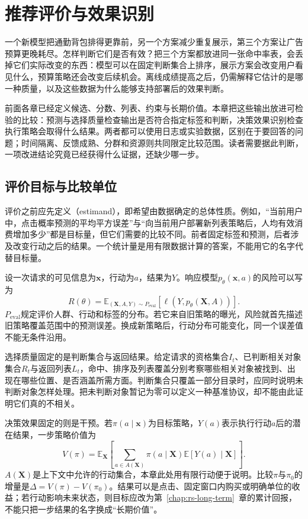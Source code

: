 \chapter{推荐评价与效果识别}
\label{chap:rs-evaluation}

一个新模型把通勤背包排得更靠前，另一个方案减少重复展示，第三个方案让广告预算更晚耗尽。怎样判断它们是否有效？把三个方案都放进同一张命中率表，会丢掉它们实际改变的东西：模型可以在固定判断集合上排序，展示方案会改变用户看见什么，预算策略还会改变后续机会。离线成绩提高之后，仍需解释它估计的是哪一种质量，以及这些数据为什么能够支持部署后的效果判断。

前面各章已经定义候选、分数、列表、约束与长期价值。本章把这些输出放进可检验的比较：预测与选择质量检查输出是否符合指定标签和判断，决策效果识别检查执行策略会取得什么结果。两者都可以使用日志或实验数据，区别在于要回答的问题；时间隔离、反馈成熟、分群和资源则共同限定比较范围。读者需要据此判断，一项改进结论究竟已经获得什么证据，还缺少哪一步。

\section{评价目标与比较单位}
\label{sec:rs-evaluation-target}

评价之前应先定义（estimand），即希望由数据确定的总体性质。例如，“当前用户中，点击概率预测的平均平方误差”与“向当前用户部署新列表策略后，人均有效消费增加多少”都是目标量，但它们需要的比较不同。前者固定标签和预测，后者涉及改变行动之后的结果。一个统计量是用有限数据计算的答案，不能用它的名字代替目标量。

设一次请求的可见信息为$\bm{x}$，行动为$a$，结果为$Y$。响应模型$p_\theta(\bm{x},a)$的风险可以写为
\begin{equation}
  R(\theta)
  =\mathbb E_{(\bm X,A,Y)\sim P_{\mathrm{eval}}}
    [\ell(Y,p_\theta(\bm X,A))].
  \label{eq:rs-evaluation-risk}
\end{equation}
$P_{\mathrm{eval}}$规定评价人群、行动和标签的分布。若它来自旧策略的曝光，风险就首先描述旧策略覆盖范围中的预测误差。换成新策略后，行动分布可能变化，同一个误差值不能无条件沿用。

选择质量固定的是判断集合与返回结果。给定请求的资格集合$I_t$、已判断相关对象集合$R_t$与返回列表$L_t$，命中、排序及列表覆盖分别考察哪些相关对象被找到、出现在哪些位置、是否涵盖所需方面。判断集合只覆盖一部分目录时，应同时说明未判断对象怎样处理。把未判断对象暂记为零可以定义一种基准协议，却不能由此证明它们真的不相关。

决策效果固定的则是干预。若$\pi(a\mid\bm x)$为目标策略，$Y(a)$表示执行行动$a$后的潜在结果，一步策略价值为
\begin{equation}
  V(\pi)=\mathbb E_{\bm X}
    \left[\sum_{a\in A(\bm X)}
      \pi(a\mid\bm X)\mathbb E[Y(a)\mid\bm X]\right].
  \label{eq:rs-evaluation-policy-value}
\end{equation}
$A(\bm X)$是上下文中允许的行动集合，本章此处用有限行动便于说明。比较$\pi$与$\pi_0$的增量是$\Delta=V(\pi)-V(\pi_0)$。结果可以是点击、固定窗口内购买或明确单位的收益；若行动影响未来状态，则目标应改为第~\ref{chap:rs-long-term}~章的累计回报，不能只把一步结果的名字换成“长期价值”。

